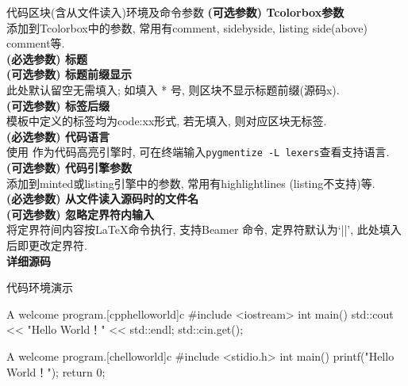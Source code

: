 \documentclass[hyperref, UTF8, CJK, aspectratio=169]{beamer}
\begin{document}
\begin{frame}{代码区块(含从文件读入)环境及命令参数}
	\alert{}\hfill \textbf{(可选参数) Tcolorbox参数}\\
	添加到Tcolorbox中的参数, 常用有comment, sidebyside, listing side(above) comment等.\\
	
	\alert{}\hfill \textbf{(必选参数) 标题}\\
	
	\alert{}\hfill \textbf{(可选参数) 标题前缀显示}\\
	此处默认留空无需填入; 如填入 * 号, 则区块不显示标题前缀(源码x).\\	
		
	\alert{}\hfill \textbf{(可选参数) 标签后缀}\\
	模板中定义的标签均为code:xx形式, 若无填入, 则对应区块无标签.\\
	
	\alert{}\hfill \textbf{(必选参数) 代码语言}\\
	使用  作为代码高亮引擎时, 可在终端输入\texttt{pygmentize -L lexers}查看支持语言.\\
	
	\alert{}\hfill \textbf{(可选参数) 代码引擎参数}\\
	添加到minted或listing引擎中的参数, 常用有highlightlines (listing不支持)等.\\
	
	\alert{}\hfill \textbf{(必选参数) 从文件读入源码时的文件名}\\
	
	\alert{}\hfill \textbf{(可选参数) 忽略定界符内输入}\\
	将定界符间内容按\LaTeX{}命令执行, 支持Beamer 命令, 定界符默认为`||', 此处填入后即更改定界符.\\
	
	\alert{}\hfill \textbf{详细源码}
\end{frame}

\begin{frame}[fragile]{代码环境演示}
	\onslide<2>
	\begin{univcode}{A welcome program.}[cpphelloworld]{c}
		#include <iostream>
		int main()
		{
			std::cout << "Hello World！" << std::endl;
			std::cin.get();
		}
	\end{univcode}
	\begin{univcode}{A welcome program.}[chelloworld]{c}
		#include <stidio.h>
		int main()
		{
			printf("Hello World！");
			return 0;
		}
	\end{univcode}
\end{frame}
\end{document}
